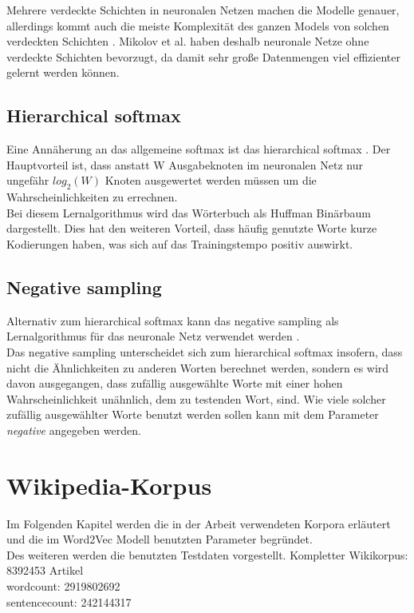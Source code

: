 \documentclass[12pt,a4paper]{report}
\begin{document}
	Mehrere verdeckte Schichten in neuronalen Netzen machen die Modelle genauer, allerdings kommt auch die meiste Komplexität des ganzen Models von solchen verdeckten Schichten \citep{DBLP:journals/corr/abs-1301-3781}. Mikolov et al. haben deshalb neuronale Netze ohne verdeckte Schichten bevorzugt, da damit sehr große Datenmengen viel effizienter gelernt werden können.
	
	\section{Hierarchical softmax}
	Eine Annäherung an das allgemeine softmax ist das hierarchical softmax \citep{DBLP:journals/corr/MikolovSCCD13}. Der Hauptvorteil ist, dass anstatt W Ausgabeknoten im neuronalen Netz nur ungefähr $log_2(W) $ Knoten ausgewertet werden müssen um die Wahrscheinlichkeiten zu errechnen. \\
	Bei diesem Lernalgorithmus wird das Wörterbuch als Huffman Binärbaum dargestellt. Dies hat den weiteren Vorteil, dass häufig genutzte Worte kurze Kodierungen haben, was sich auf das Trainingstempo positiv auswirkt.
	
	\section{Negative sampling}
	\label{sec:negativeSampling}
	Alternativ zum hierarchical softmax kann das negative sampling als Lernalgorithmus für das neuronale Netz verwendet werden \citep{DBLP:journals/corr/MikolovSCCD13}.\\
	Das negative sampling unterscheidet sich zum hierarchical softmax insofern, dass nicht die Ähnlichkeiten zu anderen Worten berechnet werden, sondern es wird davon ausgegangen, dass zufällig ausgewählte Worte mit einer hohen Wahrscheinlichkeit unähnlich, dem zu testenden Wort, sind. Wie viele solcher zufällig ausgewählter Worte benutzt werden sollen kann mit dem Parameter \textit{negative} angegeben werden.
	

	
	
\newpage
\chapter{Wikipedia-Korpus}
Im Folgenden Kapitel werden die in der Arbeit verwendeten Korpora erläutert und die im Word2Vec Modell benutzten Parameter begründet.\\
Des weiteren werden die benutzten Testdaten vorgestellt.
\iffalse
	Kompletter Wikikorpus: \\
	8392453 Artikel\\
	wordcount: 2919802692\\
	sentencecount: 242144317\\
	
\end{document}
